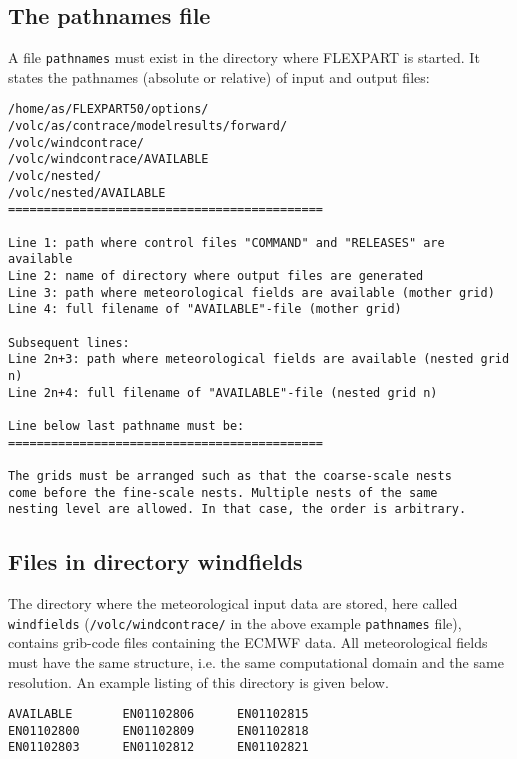 \documentclass{egu}            %
\begin{document}
\subsection{The pathnames file}
A file \verb|pathnames| must exist in the directory where FLEXPART is started.
It states the pathnames (absolute or relative) of input and output files:
\begin{footnotesize}\begin{verbatim}
/home/as/FLEXPART50/options/
/volc/as/contrace/modelresults/forward/
/volc/windcontrace/
/volc/windcontrace/AVAILABLE
/volc/nested/
/volc/nested/AVAILABLE
============================================

Line 1: path where control files "COMMAND" and "RELEASES" are available
Line 2: name of directory where output files are generated
Line 3: path where meteorological fields are available (mother grid)
Line 4: full filename of "AVAILABLE"-file (mother grid)

Subsequent lines:
Line 2n+3: path where meteorological fields are available (nested grid n)
Line 2n+4: full filename of "AVAILABLE"-file (nested grid n)

Line below last pathname must be:
============================================

The grids must be arranged such as that the coarse-scale nests
come before the fine-scale nests. Multiple nests of the same
nesting level are allowed. In that case, the order is arbitrary.
\end{verbatim}\end{footnotesize}

\newpage

\subsection{Files in directory windfields}

The directory where the meteorological input data are stored, here called
\verb|windfields| (\verb|/volc/windcontrace/| in the above example
\verb|pathnames| file), contains grib-code files containing the ECMWF data.
All meteorological fields must have the same structure, i.e.  the same
computational domain and the same resolution.  An example listing of this
directory is given below.
\begin{footnotesize}\begin{verbatim}
AVAILABLE       EN01102806      EN01102815
EN01102800      EN01102809      EN01102818
EN01102803      EN01102812      EN01102821
\end{verbatim}\end{footnotesize}
\end{document}
